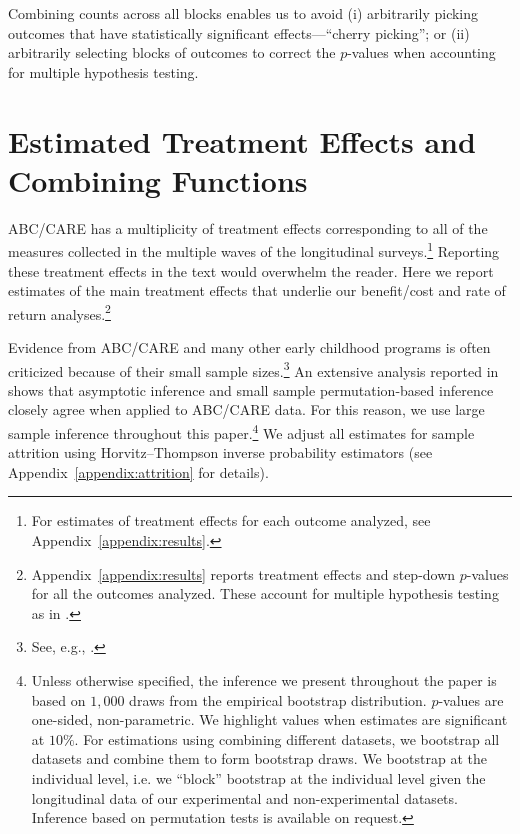 Combining counts across all blocks enables us to avoid (i) arbitrarily picking outcomes that have statistically significant effects---``cherry picking''; or (ii) arbitrarily selecting blocks of outcomes to correct the $p$-values when accounting for multiple hypothesis testing.

\section{Estimated Treatment Effects and Combining Functions}\label{section:c-functions}

ABC/CARE has a multiplicity of treatment effects corresponding to all of the measures collected in the multiple waves of the longitudinal surveys.\footnote{For estimates of treatment effects for each outcome analyzed, see Appendix~\ref{appendix:results}.} Reporting these treatment effects in the text would overwhelm the reader. Here we report estimates of the main treatment effects that underlie our benefit/cost and rate of return analyses.\footnote{Appendix~\ref{appendix:results} reports treatment effects and step-down $p$-values for all the outcomes analyzed. These account for multiple hypothesis testing as in \citet{Lehman_Romano_2005_AnnStat,Romano_Shaikh_2006_AnnStat}.}

Evidence from ABC/CARE and many other early childhood programs is often criticized because of their small sample sizes.\footnote{See, e.g., \cite{Murray_2013_GivingKids_JJHBOOK}.} An extensive analysis reported in \citet{Campbell_Conti_etal_2014_EarlyChildhoodInvestments} shows that asymptotic inference and small sample permutation-based inference closely agree when applied to ABC/CARE data. For this reason, we use large sample inference throughout this paper.\footnote{Unless otherwise specified, the inference we present throughout the paper is based on $1,000$ draws from the empirical bootstrap distribution. $p$-values are one-sided, non-parametric. We highlight values when estimates are significant at $10\%$. For estimations using combining different datasets, we bootstrap all datasets and combine them to form bootstrap draws. We bootstrap at the individual level, i.e. we ``block'' bootstrap at the individual level given the longitudinal data of our experimental and non-experimental datasets. Inference based on permutation tests is available on request.} We adjust all estimates for sample attrition using Horvitz--Thompson \citeyearpar{Horvitz_Thompson_1952_JASA} inverse probability estimators (see Appendix~\ref{appendix:attrition} for details).

